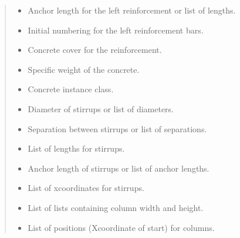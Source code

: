 \documentclass[a4paper,10pt,english]{sphinxmanual}
\begin{document}
\begin{fulllineitems}
\begin{quote}
\begin{description}
\begin{itemize}
\item {} 
\sphinxAtStartPar
{} \textendash{} Anchor length for the left reinforcement or list of lengths.

\item {} 
\sphinxAtStartPar
{} \textendash{} Initial numbering for the left reinforcement bars.

\item {} 
\sphinxAtStartPar
{} \textendash{} Concrete cover for the reinforcement.

\item {} 
\sphinxAtStartPar
{} \textendash{} Specific weight of the concrete.

\item {} 
\sphinxAtStartPar
{} \textendash{} Concrete instance class.

\item {} 
\sphinxAtStartPar
{} \textendash{} Diameter of stirrups or list of diameters.

\item {} 
\sphinxAtStartPar
{} \textendash{} Separation between stirrups or list of separations.

\item {} 
\sphinxAtStartPar
{} \textendash{} List of lengths for stirrups.

\item {} 
\sphinxAtStartPar
{} \textendash{} Anchor length of stirrups or list of anchor lengths.

\item {} 
\sphinxAtStartPar
{} \textendash{} List of x\sphinxhyphen{}coordinates for stirrups.

\item {} 
\sphinxAtStartPar
{} \textendash{} List of lists containing column width and height.

\item {} 
\sphinxAtStartPar
{} \textendash{} List of positions (X\sphinxhyphen{}coordinate of start) for columns.


\end{itemize}
\end{description}
\end{quote}
\end{fulllineitems}
\end{document}
